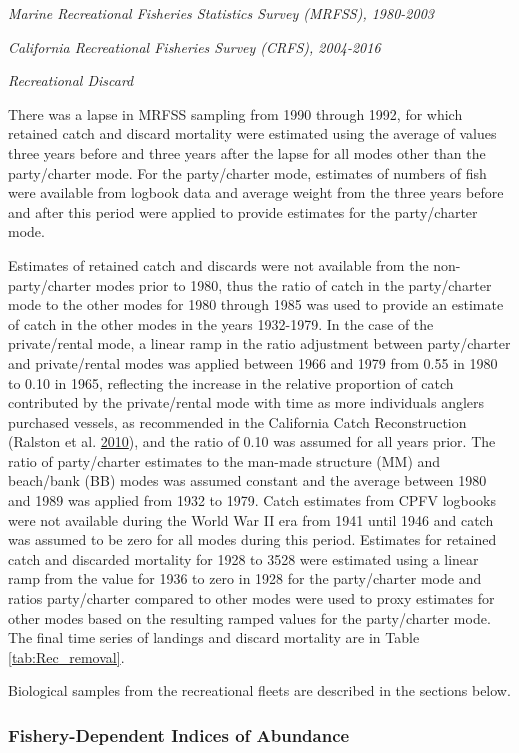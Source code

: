 \documentclass[12pt,]{article}
\begin{document}
\emph{Marine Recreational Fisheries Statistics Survey (MRFSS),
1980-2003}

\emph{California Recreational Fisheries Survey (CRFS), 2004-2016}

\emph{Recreational Discard}

There was a lapse in MRFSS sampling from 1990 through 1992, for which
retained catch and discard mortality were estimated using the average of
values three years before and three years after the lapse for all modes
other than the party/charter mode. For the party/charter mode, estimates
of numbers of fish were available from logbook data and average weight
from the three years before and after this period were applied to
provide estimates for the party/charter mode.

Estimates of retained catch and discards were not available from the
non-party/charter modes prior to 1980, thus the ratio of catch in the
party/charter mode to the other modes for 1980 through 1985 was used to
provide an estimate of catch in the other modes in the years 1932-1979.
In the case of the private/rental mode, a linear ramp in the ratio
adjustment between party/charter and private/rental modes was applied
between 1966 and 1979 from 0.55 in 1980 to 0.10 in 1965, reflecting the
increase in the relative proportion of catch contributed by the
private/rental mode with time as more individuals anglers purchased
vessels, as recommended in the California Catch Reconstruction (Ralston
et al. \protect\hyperlink{ref-Ralston2010}{2010}), and the ratio of 0.10
was assumed for all years prior. The ratio of party/charter estimates to
the man-made structure (MM) and beach/bank (BB) modes was assumed
constant and the average between 1980 and 1989 was applied from 1932 to
1979. Catch estimates from CPFV logbooks were not available during the
World War II era from 1941 until 1946 and catch was assumed to be zero
for all modes during this period. Estimates for retained catch and
discarded mortality for 1928 to 3528 were estimated using a linear ramp
from the value for 1936 to zero in 1928 for the party/charter mode and
ratios party/charter compared to other modes were used to proxy
estimates for other modes based on the resulting ramped values for the
party/charter mode. The final time series of landings and discard
mortality are in Table \ref{tab:Rec_removal}.

Biological samples from the recreational fleets are described in the
sections below.

\subsubsection{Fishery-Dependent Indices of
Abundance}\label{fishery-dependent-indices-of-abundance}
\end{document}
